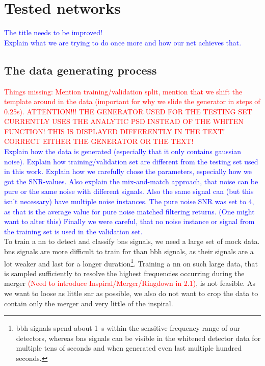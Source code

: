 \section{Tested networks}
\textcolor{blue}{The title needs to be improved!\\Explain what we are trying to do once more and how our net achieves that.}
\subsection{The data generating process}
\textcolor{red}{Things missing: Mention training/validation split, mention that we shift the template around in the data (important for why we slide the generator in steps of 0.25s). ATTENTION!!! THE GENERATOR USED FOR THE TESTING SET CURRENTLY USES THE ANALYTIC PSD INSTEAD OF THE WHITEN FUNCTION! THIS IS DISPLAYED DIFFERENTLY IN THE TEXT! CORRECT EITHER THE GENERATOR OR THE TEXT!}\\
\textcolor{blue}{Explain how the data is generated (especially that it only contains gaussian noise). Explain how training/validation set are different from the testing set used in this work. Explain how we carefully chose the parameters, especially how we got the SNR-values. Also explain the mix-and-match approach, that noise can be pure or the same noise with different signals. Also the same signal can (but this isn't necessary) have multiple noise instances. The pure noise SNR was set to 4, as that is the average value for pure noise matched filtering returns. (One might want to alter this) Finally we were careful, that no noise instance or signal from the training set is used in the validation set.}\\
To train a \gls{nn} to detect and classify \gls{bns} signals, we need a large set of mock data. \gls{bns} signals are more difficult to train for than \gls{bbh} signals, as their signals are a lot weaker and last for a longer duration\footnote{\gls{bbh} signals spend about \SI{1}{\s} within the sensitive frequency range of our detectors, whereas \gls{bns} signals can be visible in the whitened detector data for multiple tens of seconds \cite{gw170817} and when generated even last multiple hundred seconds.}. Training a \gls{nn} on such large data, that is sampled sufficiently to resolve the highest frequencies occurring during the merger \textcolor{red}{(Need to introduce Inspiral/Merger/Ringdown in 2.1)}, is not feasible. As we want to loose as little \gls{snr} as possible, we also do not want to crop the data to contain only the merger and very little of the inspiral.\\
